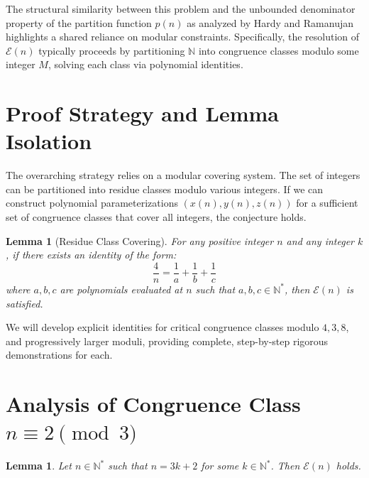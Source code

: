 \documentclass[12pt, a4paper]{article}
\newtheorem{lemma}[theorem]{Lemma}
\theoremstyle{definition}
\theoremstyle{remark}
\begin{document}
The structural similarity between this problem and the unbounded denominator property of the partition function $p(n)$ as analyzed by Hardy and Ramanujan highlights a shared reliance on modular constraints. Specifically, the resolution of $\mathcal{E}(n)$ typically proceeds by partitioning $\mathbb{N}$ into congruence classes modulo some integer $M$, solving each class via polynomial identities.

\section{Proof Strategy and Lemma Isolation}

The overarching strategy relies on a modular covering system. The set of integers can be partitioned into residue classes modulo various integers. If we can construct polynomial parameterizations $(x(n), y(n), z(n))$ for a sufficient set of congruence classes that cover all integers, the conjecture holds.

\begin{lemma}[Residue Class Covering]
For any positive integer $n$ and any integer $k$, if there exists an identity of the form:
\begin{equation}
\frac{4}{n} = \frac{1}{a} + \frac{1}{b} + \frac{1}{c}
\end{equation}
where $a, b, c$ are polynomials evaluated at $n$ such that $a,b,c \in \mathbb{N}^*$, then $\mathcal{E}(n)$ is satisfied.
\end{lemma}

We will develop explicit identities for critical congruence classes modulo $4, 3, 8$, and progressively larger moduli, providing complete, step-by-step rigorous demonstrations for each.


\section{Analysis of Congruence Class $n \equiv 2 \pmod 3$}

\begin{lemma}
Let $n \in \mathbb{N}^*$ such that $n = 3k + 2$ for some $k \in \mathbb{N}^*$. Then $\mathcal{E}(n)$ holds.
\end{lemma}
\end{document}
